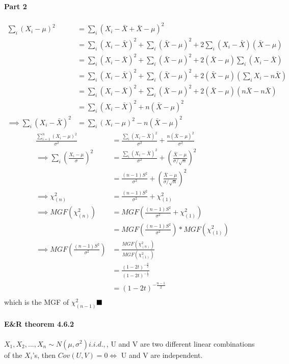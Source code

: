 \documentclass[11pt]{article}
\newcommand{\qed}[0]{$\hfill\blacksquare$}
\begin{document}
\paragraph{Part 2}
\begin{align*}
	\sum_i(X_i - \mu)^2 &= \sum_i(X_i - \bar X + \bar X - \mu)^2 \\
	&= \sum_i(X_i - \bar X)^2 + \sum_i(\bar X - \mu)^2 + 2\sum_i(X_i - \bar X)(\bar X - \mu)\\
	&= \sum_i(X_i - \bar X)^2 + \sum_i(\bar X - \mu)^2 + 2(\bar X - \mu)\sum_i(X_i - \bar X)\\
	&= \sum_i(X_i - \bar X)^2 + \sum_i(\bar X - \mu)^2 + 2(\bar X - \mu)(\sum_i X_i - n\bar X)\\
	&= \sum_i(X_i - \bar X)^2 + \sum_i(\bar X - \mu)^2 + 2(\bar X - \mu)(n\bar X - n\bar X)\\
	&= \sum_i(X_i - \bar X)^2 + n(\bar X - \mu)^2 \\
	\implies \sum_i(X_i - \bar X)^2 &= \sum_i(X_i - \mu)^2 - n(\bar X - \mu)^2
\end{align*}
\begin{align*}
\frac{\sum_{i=1}^n(X_i - \mu)^2}{\sigma^2} &= \frac{\sum_i(X_i - \bar X)^2}{\sigma^2} + \frac{ n(\bar X - \mu)^2}{\sigma^2} \\
	\implies \sum_{i}(\frac{X_i - \mu}{\sigma})^2 &= \frac{\sum_i(X_i - \bar X)^2}{\sigma^2} + (\frac{\bar X - \mu}{\sigma/\sqrt{n}})^2 \\
	&= \frac{(n-1)S^2}{\sigma^2} + (\frac{\bar X - \mu}{\sigma/\sqrt{n}})^2 \\
	\implies \chi_{(n)}^2 &= \frac{(n-1)S^2}{\sigma^2} + \chi^2_{(1)}\\
	\implies MGF(\chi_{(n)}^2) &= MGF(\frac{(n-1)S^2}{\sigma^2} + \chi^2_{(1)})\\
	&= MGF(\frac{(n-1)S^2}{\sigma^2})* MGF(\chi^2_{(1)})\\
	\implies MGF(\frac{(n-1)S^2}{\sigma^2}) &=  \frac{MGF(\chi_{(n)}^2)}{MGF(\chi^2_{(1)})}\\
	&= \frac{(1-2t)^{-\frac{n}{2}}}{(1-2t)^{-\frac{1}{2}}} \\
	&= (1-2t)^{-\frac{n-1}{2}} \\
\end{align*}
which is the MGF of $\chi^2_{(n-1)}$\qed
\paragraph{E\&R theorem 4.6.2}
 $X_1, X_2,..., X_n \sim N(\mu,\sigma ^2)i.i.d., $, U and V are two different linear combinations of the $X_i$'s, then \newline
 $Cov(U,V) = 0 \iff$ U and V are independent.
\end{document}
